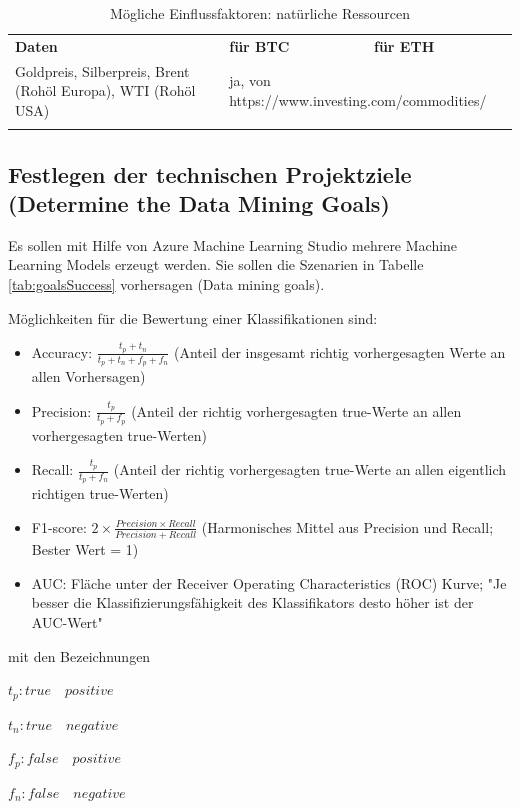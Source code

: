 \begin{centering} \footnotesize \begin{longtable}[H]{|p{7cm}|p{}|p{}|}
\hline
\textbf{Daten} & \textbf{für BTC} & \textbf{für ETH} \\
\hhline{===}
Goldpreis, Silberpreis, Brent (Rohöl Europa), WTI (Rohöl USA) & \multicolumn{2}{p{9cm}|}{ja, von https://www.investing.com/commodities/}\\ \hline
\caption{Mögliche Einflussfaktoren: natürliche Ressourcen}
\label{tab:dataToAnalyseE}
\end{longtable} \end{centering}

\subsection{Festlegen der technischen Projektziele (Determine the Data Mining Goals)}\label{subsec:goals}
Es sollen mit Hilfe von Azure Machine Learning Studio mehrere Machine Learning Models erzeugt werden. Sie sollen die Szenarien in Tabelle \ref{tab:goalsSuccess} vorhersagen (Data mining goals).\par
Möglichkeiten für die Bewertung einer Klassifikationen sind:
\begin{itemize}
\item Accuracy: $ \frac{t_{p} + t_{n}}{t_{p} + t_{n} + f_{p} + f_{n}}$ (Anteil der insgesamt richtig vorhergesagten Werte an allen Vorhersagen)
\item Precision: $ \frac{t_{p}}{t_{p} + f_{p}}$ (Anteil der richtig vorhergesagten true-Werte an allen vorhergesagten true-Werten)
\item Recall: $ \frac{t_{p}}{t_{p} + f_{n}}$ (Anteil der richtig vorhergesagten true-Werte an allen eigentlich richtigen true-Werten)
\item F1-score: $ 2 \times \frac{Precision \times Recall}{Precision + Recall}$ (Harmonisches Mittel aus Precision und Recall; Bester Wert = 1)
\item AUC: Fläche unter der Receiver Operating Characteristics (ROC) Kurve; "Je besser die Klassifizierungsfähigkeit des Klassifikators desto höher ist der AUC-Wert"\citep[ROC-Kurve]{lohninger_grundlagen_2013} 
\end{itemize} 
mit den Bezeichnungen \par
\begin{framed}
$ t_{p} : true \quad positive $ \par
$ t_{n} : true \quad negative $ \par
$ f_{p} : false \quad positive $ \par
$ f_{n} : false \quad negative $
\end{framed}
